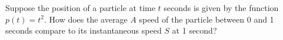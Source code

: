 \documentclass{ximera}
\begin{document}
\begin{problem}

  Suppose the position of a particle at time $t$ seconds is given by
  the function $p(t) = t^2$.  How does the average $A$ speed of the
  particle between 0 and 1 seconds compare to its instantaneous speed
  $S$ at 1 second?
  \begin{multipleChoice}
  \end{multipleChoice}
\end{problem}
\end{document}
